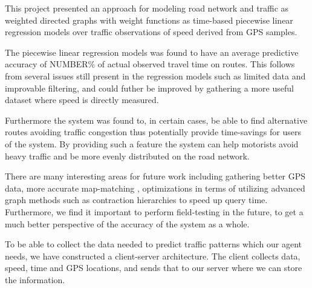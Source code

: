 This project presented an approach for modeling road network and traffic as weighted directed graphs with weight functions as time-based piecewise linear regression models over traffic observations of speed derived from GPS samples.

The piecewise linear regression models was found to have an average predictive accuracy of NUMBER\% of actual observed travel time on routes. This follows from several issues still present in the regression models such as limited data and improvable filtering, and could futher be improved by gathering a more useful dataset where speed is directly measured.

Furthermore the system was found to, in certain cases, be able to find alternative routes avoiding traffic congestion thus potentially provide time-savings for users of the system. By providing such a feature the system can help motorists avoid heavy traffic and be more evenly distributed on the road network.

There are many interesting areas for future work including gathering better GPS data, more accurate map-matching , optimizations in terms of utilizing advanced graph methods such as contraction hierarchies to speed up query time. Furthermore, we find it important to perform field-testing in the future, to get a much better perspective of the accuracy of the system as a whole.

To be able to collect the data needed to predict traffic patterns which our agent needs, we have constructed a client-server architecture. The client collects data, speed, time and GPS locations, and sends that to our server where we can store the information.